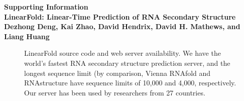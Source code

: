 \onecolumn
\newpage
  \begin{centering}
    \vspace*{1cm}
    
    \textbf{\Huge Supporting Information}\\
    \vspace{0.5cm}
    \textbf{\Huge LinearFold: Linear-Time Prediction of RNA Secondary Structure}\\
    \vspace{0.5cm}
    \textbf{\large Dezhong Deng, Kai Zhao, David Hendrix, David H. Mathews, and
      Liang Huang}
    \vspace{1.5cm}
    
  \end{centering}

\setcounter{figure}{0}
\renewcommand{\thefigure}{SI\,\arabic{figure}} %
\setcounter{table}{0}
\renewcommand{\thetable}{SI\,\arabic{table}}


\begin{figure}[h]
  \centering
  \caption {LinearFold source code and web server availability. We have the world's fastest RNA secondary structure prediction server, and the longest sequence limit (by comparison,
  Vienna RNAfold and RNAstructure have sequence limits of 10,000 and 4,000, respectively.
  Our \linearfold server has been used by researchers from 27 countries.}
  \label{fig:codeserver}
\end{figure}

